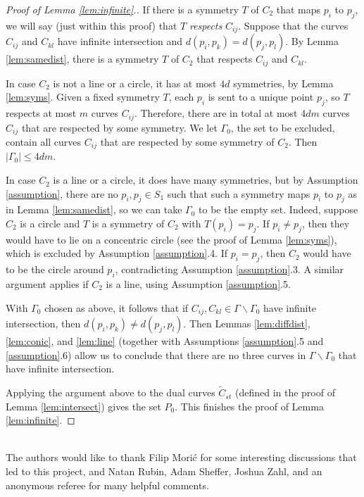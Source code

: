 \documentclass[12pt]{article}
\begin{document}
\begin{proof}[Proof of Lemma \ref{lem:infinite}.]
 If there is a symmetry $T$ of $C_2$ that maps $p_i$ to $p_j$,
 we will say (just within this proof) that $T$ \textit{respects} $C_{ij}$.
 Suppose that the curves $C_{ij}$ and $C_{kl}$ have infinite intersection and $d(p_i,p_k) = d(p_j, p_l)$.
 By Lemma \ref{lem:samedist}, there is a symmetry $T$ of $C_2$ that respects $C_{ij}$ and $C_{kl}$. 
  
 In case $C_2$ is not a line or a circle, it has at most $4d$ symmetries, by Lemma \ref{lem:syms}.
 Given a fixed symmetry $T$, each $p_i$ is sent to a unique point $p_j$,
 so $T$ respects at most $m$ curves $C_{ij}$.
 Therefore, there are in total at most $4dm$ curves $C_{ij}$ that are respected by some symmetry.
 We let $\Gamma_0$, the set to be excluded, contain all curves $C_{ij}$ 
 that are respected by some symmetry of $C_2$.
 Then $|\Gamma_0|\leq 4dm$.
  
 In case $C_2$ is a line or a circle, it does have many symmetries, 
 but by Assumption \ref{assumption}, 
 there are no $p_i, p_j\in S_1$ such that such a symmetry maps $p_i$ to $p_j$ 
 as in Lemma \ref{lem:samedist},
 so we can take $\Gamma_0$ to be the empty set.
 Indeed, suppose  $C_2$ is a circle and $T$ is a symmetry of $C_2$ with $T(p_i) = p_j$.
 If $p_i\neq p_j$, then they would have to lie on a concentric circle
 (see the proof of Lemma \ref{lem:syms}),
 which is excluded by Assumption \ref{assumption}.4.
 If $p_i= p_j$, then $C_2$ would have to be the circle around $p_i$, 
 contradicting Assumption \ref{assumption}.3.
 A similar argument applies if $C_2$ is a line, using Assumption \ref{assumption}.5.
  
 With $\Gamma_0$ chosen as above,
 it follows that if $C_{ij}, C_{kl}\in \Gamma\backslash \Gamma_0$ have infinite intersection,
 then $d(p_i,p_k) \neq d(p_j, p_l)$.
 Then Lemmas \ref{lem:diffdist}, \ref{lem:conic}, and \ref{lem:line} (together with Assumptions \ref{assumption}.5 and \ref{assumption}.6)
 allow us to conclude that there are no three curves in $\Gamma\backslash \Gamma_0$ that have infinite intersection.
 
 
 Applying the argument above to the dual curves $\widetilde{C}_{st}$
 (defined in the proof of Lemma \ref{lem:intersect}) gives the set $P_0$.
 This finishes the proof of Lemma \ref{lem:infinite}.
\end{proof}

  \vspace{30pt} 
  \\
  The authors would like to thank Filip Mori\'c for some interesting discussions that led to this project, 
  and Natan Rubin, Adam Sheffer, Joshua Zahl, and an anonymous referee for many helpful comments.
\end{document}
